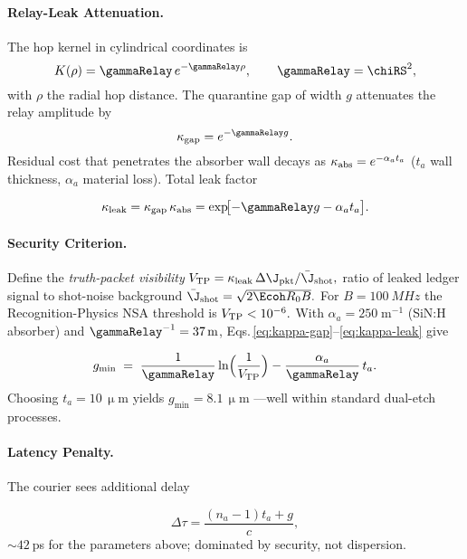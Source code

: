 \documentclass[11pt,oneside]{book}
\begin{document}
{\paragraph{Relay-Leak Attenuation.}
The hop kernel in cylindrical coordinates is
\[
   K(\rho)=\gammaRelay\,e^{-\gammaRelay\rho},
   \qquad
   \gammaRelay=\chiRS^{2},
\]
with $\rho$ the radial hop distance.  
The quarantine gap of width $g$ attenuates the relay amplitude by
\[
   \kappa_{\rm gap}
   =
   e^{-\gammaRelay g}.
   \label{eq:kappa-gap}
\]
Residual cost that penetrates the absorber wall decays as
\(
   \kappa_{\rm abs}=e^{-\alpha_{a}t_{a}}
\)
($t_{a}$ wall thickness, $\alpha_{a}$ material loss).  
Total leak factor  

\[
   \kappa_{\rm leak}
   =
   \kappa_{\rm gap}\,\kappa_{\rm abs}
   =
   \exp\!\bigl[-\gammaRelay g-\alpha_{a}t_{a}\bigr].
   \label{eq:kappa-leak}
\]

\paragraph{Security Criterion.}
Define the \emph{truth-packet visibility}
\(
   V_{\rm TP}= \kappa_{\rm leak}\,
   \Delta\J_{\text{pkt}}/\bar{\J}_{\rm shot},
\)
ratio of leaked ledger signal to shot-noise background
\(
   \bar{\J}_{\rm shot}= \sqrt{2\Ecoh R_{0}B}.
\)
For $B=\SI{100}{MHz}$ the Recognition-Physics NSA threshold is
\(
   V_{\rm TP}<10^{-6}.
\)
With $\alpha_{a}=250\;\mathrm{m^{-1}}$ (SiN:H absorber) and
$\gammaRelay^{-1}=37\,\mathrm{m}$,
Eqs.\,\eqref{eq:kappa-gap}–\eqref{eq:kappa-leak} give

\[
   g_{\min}
   \;=\;
   \frac{1}{\gammaRelay}
   \ln\Bigl(\frac{1}{V_{\rm TP}}\Bigr)
   -\frac{\alpha_{a}}{\gammaRelay}\,t_{a}.
\]
Choosing $t_{a}=10\,\upmu$m yields
\(
   g_{\min}=8.1\,\upmu\text{m}
\)
—well within standard dual-etch processes.

\paragraph{Latency Penalty.}
The courier sees additional delay

\[
   \Delta\tau
   =
   \frac{(n_{a}-1)t_{a}+g}{c},
\]
$\sim\!42$ ps for the parameters above; dominated by security, not
dispersion.

}
\end{document}
